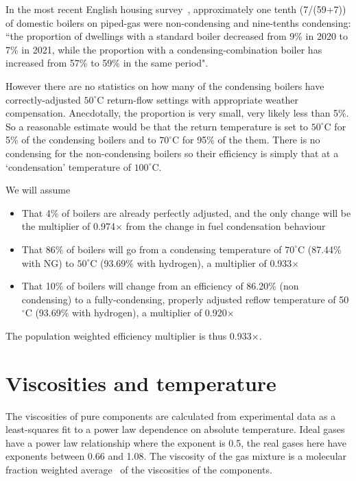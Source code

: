 \documentclass[5p]{elsarticle} %
\begin{document}
In the most recent English housing survey~\citep{ehs21}, approximately one tenth (7/(59+7)) of domestic boilers on piped-gas were non-condensing and nine-tenths condensing: 
``the proportion of dwellings with a standard boiler decreased from 9\% in 2020 to 7\% in 2021, while the proportion with a condensing-combination boiler has increased from 57\% to 59\% in the same period".

However there are no statistics on how many of the condensing boilers have correctly-adjusted $50^\circ$C return-flow settings with appropriate weather compensation. Anecdotally, the proportion is very small, very likely less than 5\%. So a reasonable estimate would be that the return temperature is set to $50^\circ$C for 5\% of the condensing boilers and to $70^\circ$C for 95\% of the them. There is no condensing for the non-condensing boilers so their efficiency is simply that at  a `condensation' temperature of $100^\circ$C.

We will assume
\begin{itemize}

    \item That 4\% of boilers are already perfectly adjusted, and the only change will be the multiplier of 0.974$\times$ from the change in fuel condensation behaviour
    \item That 86\% of boilers will go from a condensing temperature of $70^\circ$C (87.44\% with NG) to $50^\circ$C (93.69\% with hydrogen), a multiplier of  0.933$\times$
    
    \item That 10\% of boilers will change from an efficiency of  86.20\% (non condensing) to a fully-condensing, properly adjusted reflow temperature of 50$^\circ$C (93.69\% with hydrogen), a multiplier of 0.920$\times$
\end{itemize}
The population weighted efficiency multiplier is thus 0.933$\times$.


\section{Viscosities and temperature}
\label{sec:viscosities}
The viscosities of pure components are calculated from experimental data as a least-squares fit to a power law dependence on absolute temperature. Ideal gases have a power law relationship where the exponent is 0.5, the real gases here have exponents between 0.66 and 1.08. The viscosity of the gas mixture is a molecular fraction weighted average~\citep{Krieger1951} of the viscosities of the components.
\end{document}
